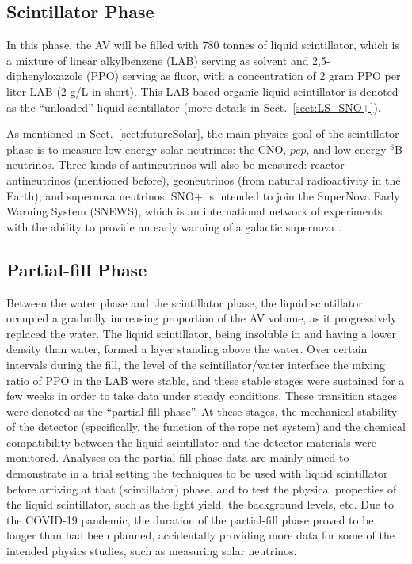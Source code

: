 \subsection{Scintillator Phase} \label{sect:scintPhase}

In this phase, the AV will be filled with 780 tonnes of liquid scintillator, which is a mixture of linear alkylbenzene (LAB) serving as solvent and 2,5-diphenyloxazole (PPO) serving as fluor, with a concentration of 2 gram PPO per liter LAB (2 g/L in short). This LAB-based organic liquid scintillator is denoted as the ``unloaded'' liquid scintillator (more details in Sect.~\ref{sect:LS_SNO+}).

As mentioned in Sect.~\ref{sect:futureSolar}, the main physics goal of the scintillator phase is to measure low energy solar neutrinos: the CNO, $pep$, and low energy $^8$B neutrinos. Three kinds of antineutrinos will also be measured: reactor antineutrinos (mentioned before), geoneutrinos (from natural radioactivity in the Earth); and supernova neutrinos. SNO+ is intended to join the SuperNova Early Warning System (SNEWS), which is an international network of experiments with the ability to provide an early warning of a galactic supernova \cite{snop_jinst}.

\subsection{Partial-fill Phase} \label{sect:partialPhase}

Between the water phase and the scintillator phase, the liquid scintillator occupied a gradually increasing proportion of the AV volume, as it progressively replaced the water. The liquid scintillator, being insoluble in and having a lower density than water, formed a layer standing above the water. Over certain intervals during the fill, the level of the scintillator/water interface the mixing ratio of PPO in the LAB were stable, and these stable stages were sustained for a few weeks in order to take data under steady conditions. These transition stages were denoted as the ``partial-fill phase''. At these stages, the mechanical stability of the detector (specifically, the function of the rope net system) and the chemical compatibility between the liquid scintillator and the detector materials were monitored. Analyses on the partial-fill phase data are mainly aimed to demonstrate in a trial setting the techniques to be used with liquid scintillator before arriving at that (scintillator) phase, and to test the physical properties of the liquid scintillator, such as the light yield, the background levels, etc. Due to the COVID-19 pandemic, the duration of the partial-fill phase proved to be longer than had been planned, accidentally providing more data for some of the intended physics studies, such as measuring solar neutrinos.

